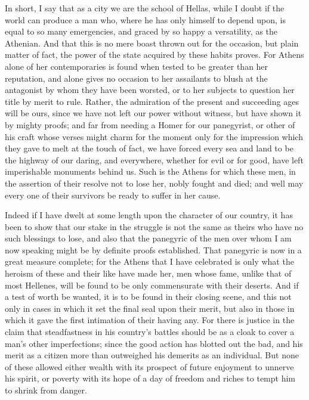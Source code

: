 \documentclass[a4paper]{amsbook}
\begin{document}
In short, I say that as a city we are the school of Hellas, while I doubt if the world can produce a man who, where he has only himself to depend upon, is equal to so many emergencies, and graced by so happy a versatility, as the Athenian. And that this is no mere boast thrown out for the occasion, but plain matter of fact, the power of the state acquired by these habits proves. For Athens alone of her contemporaries is found when tested to be greater than her reputation, and alone gives no occasion to her assailants to blush at the antagonist by whom they have been worsted, or to her subjects to question her title by merit to rule. Rather, the admiration of the present and succeeding ages will be ours, since we have not left our power without witness, but have shown it by mighty proofs; and far from needing a Homer for our panegyrist, or other of his craft whose verses might charm for the moment only for the impression which they gave to melt at the touch of fact, we have forced every sea and land to be the highway of our daring, and everywhere, whether for evil or for good, have left imperishable monuments behind us. Such is the Athens for which these men, in the assertion of their resolve not to lose her, nobly fought and died; and well may every one of their survivors be ready to suffer in her cause.

Indeed if I have dwelt at some length upon the character of our country, it has been to show that our stake in the struggle is not the same as theirs who have no such blessings to lose, and also that the panegyric of the men over whom I am now speaking might be by definite proofs established. That panegyric is now in a great measure complete; for the Athens that I have celebrated is only what the heroism of these and their like have made her, men whose fame, unlike that of most Hellenes, will be found to be only commensurate with their deserts. And if a test of worth be wanted, it is to be found in their closing scene, and this not only in cases in which it set the final seal upon their merit, but also in those in which it gave the first intimation of their having any. For there is justice in the claim that steadfastness in his country's battles should be as a cloak to cover a man's other imperfections; since the good action has blotted out the bad, and his merit as a citizen more than outweighed his demerits as an individual. But none of these allowed either wealth with its prospect of future enjoyment to unnerve his spirit, or poverty with its hope of a day of freedom and riches to tempt him to shrink from danger.
\end{document}
